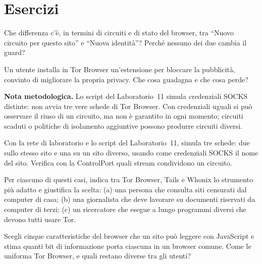 \section*{Esercizi}

\begin{esercizio}[1]\label{es:23-identita}
Che differenza c'è, in termini di circuiti e di stato del browser, tra \enquote{Nuovo circuito per questo sito} e \enquote{Nuova identità}? Perché nessuno dei due cambia il guard?
\end{esercizio}

\begin{esercizio}[1]\label{es:23-estensioni}
Un utente installa in Tor Browser un'estensione per bloccare la pubblicità, convinto di migliorare la propria privacy. Che cosa guadagna e che cosa perde?
\end{esercizio}

\textbf{Nota metodologica.} Lo script del Laboratorio~11 simula credenziali SOCKS distinte: non avvia tre vere schede di Tor Browser. Con credenziali uguali si può osservare il riuso di un circuito, ma non è garantito in ogni momento; circuiti scaduti o politiche di isolamento aggiuntive possono produrre circuiti diversi.

\begin{esercizio}[2]\label{es:23-isolamento}
Con la rete di laboratorio e lo script del Laboratorio~11, simula tre schede: due sullo stesso sito e una su un sito diverso, usando come credenziali SOCKS il nome del sito. Verifica con la ControlPort quali stream condividono un circuito.
\end{esercizio}

\begin{esercizio}[2]\label{es:23-scelta}
Per ciascuno di questi casi, indica tra Tor Browser, Tails e Whonix lo strumento più adatto e giustifica la scelta: (a) una persona che consulta siti censurati dal computer di casa; (b) una giornalista che deve lavorare su documenti riservati da computer di terzi; (c) un ricercatore che esegue a lungo programmi diversi che devono tutti usare Tor.
\end{esercizio}

\begin{esercizio}[3]\label{es:23-impronta}
Scegli cinque caratteristiche del browser che un sito può leggere con JavaScript e stima quanti bit di informazione porta ciascuna in un browser comune. Come le uniforma Tor Browser, e quali restano diverse tra gli utenti?
\end{esercizio}

